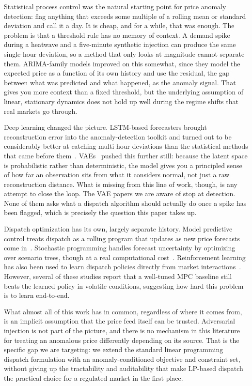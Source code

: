 \documentclass[journal]{IEEEtran}
\begin{document}
Statistical process control was the natural starting point for price anomaly detection: flag anything that exceeds some multiple of a rolling mean or standard deviation and call it a day. It is cheap, and for a while, that was enough. The problem is that a threshold rule has no memory of context. A demand spike during a heatwave and a five-minute synthetic injection can produce the same single-hour deviation, so a method that only looks at magnitude cannot separate them. ARIMA-family models improved on this somewhat, since they model the expected price as a function of its own history and use the residual, the gap between what was predicted and what happened, as the anomaly signal. That gives you more context than a fixed threshold, but the underlying assumption of linear, stationary dynamics does not hold up well during the regime shifts that real markets go through.

Deep learning changed the picture. LSTM-based forecasters brought reconstruction error into the anomaly-detection toolkit and turned out to be considerably better at catching multi-hour deviations than the statistical methods that came before them~\cite{LSTM_Anomaly}. VAEs~\cite{VAE} pushed this further still: because the latent space is probabilistic rather than deterministic, the model gives you a principled sense of how far an observation sits from what it considers normal, not just a raw reconstruction distance. What is missing from this line of work, though, is any attempt to close the loop. The VAE papers we are aware of stop at detection. None of them asks what a dispatch algorithm should actually do once a spike has been flagged, which is precisely the question this paper takes up.

Dispatch optimization has its own, largely separate history. Model predictive control treats dispatch as a rolling program that updates as new price forecasts come in~\cite{MPC_BESS}. Stochastic programming handles forecast uncertainty by optimizing over scenario trees, though at a real computational cost~\cite{BESS}. Reinforcement learning has also been used to learn dispatch policies directly from market interactions~\cite{RL_Dispatch, Vulnerability_Analysis}. However, several of these studies report that a well-tuned MPC baseline still beats the learned policy in volatile conditions, suggesting how hard this problem is to learn end-to-end.

What almost all of this work has in common, regardless of where it comes from, is an implicit assumption that the price feed itself can be trusted. Adversarial injection is not part of the picture, and there is no mechanism in this literature for treating an anomalous price differently depending on its source. That is the specific gap we are targeting: we extend the standard linear programming dispatch formulation with an anomaly-conditioned objective and constraint set, without giving up the tractability and auditability that make LP-based dispatch the practical choice for a regulated market in the first place.
\end{document}
